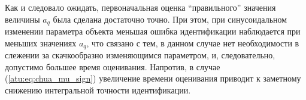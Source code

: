 Как и следовало ожидать, первоначальная оценка ``правильного'' значения величины $a_q$
была сделана достаточно точно. При этом, при синусоидальном изменении параметра объекта
меньшая ошибка идентификации наблюдается при меньших значениях $a_q$, что связано
с тем, в данном случае нет необходимости в слежении за скачкообразно изменяющимся параметром,
и, следовательно, допустимо большее время оценивания. Напротив, в случае (\ref{atu:eq:chua_mu_sign})
увеличение времени оценивания приводит к заметному снижению интегральной точности идентификации.



